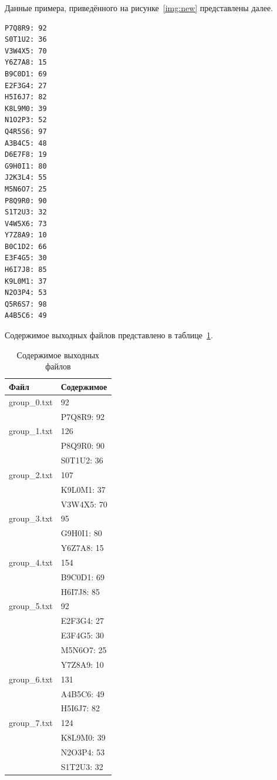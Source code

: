 Данные примера, приведённого на рисунке~\ref{img:new} представлены далее.
\begin{lstlisting}
P7Q8R9: 92
S0T1U2: 36
V3W4X5: 70
Y6Z7A8: 15
B9C0D1: 69
E2F3G4: 27
H5I6J7: 82
K8L9M0: 39
N1O2P3: 52
Q4R5S6: 97
A3B4C5: 48
D6E7F8: 19
G9H0I1: 80
J2K3L4: 55
M5N6O7: 25
P8Q9R0: 90
S1T2U3: 32
V4W5X6: 73
Y7Z8A9: 10
B0C1D2: 66
E3F4G5: 30
H6I7J8: 85
K9L0M1: 37
N2O3P4: 53
Q5R6S7: 98
A4B5C6: 49
\end{lstlisting}

Содержимое выходных файлов представлено в таблице~\ref{tab:output_files}.
\newpage
\begin{table}[H]
	\centering
	\small
	\caption{Содержимое выходных файлов}
	\label{tab:output_files}
	\begin{tabular}{|l|l|}
		\hline
		\textbf{Файл} & \textbf{Содержимое} \\ \hline
		group\_0.txt & 92 \\ 
		& P7Q8R9: 92 \\ \hline
		
		group\_1.txt & 126 \\
		& P8Q9R0: 90 \\
		& S0T1U2: 36 \\\hline
		
		group\_2.txt & 107 \\
		& K9L0M1: 37 \\
		& V3W4X5: 70 \\\hline
		
		group\_3.txt & 95 \\
		& G9H0I1: 80 \\
		& Y6Z7A8: 15 \\\hline
		
		
		group\_4.txt & 154 \\
		& B9C0D1: 69 \\
		& H6I7J8: 85 \\\hline
		
		group\_5.txt & 92 \\
		& E2F3G4: 27 \\
		& E3F4G5: 30 \\
		& M5N6O7: 25 \\
		& Y7Z8A9: 10 \\\hline
		
		
		group\_6.txt & 131 \\
		& A4B5C6: 49 \\
		& H5I6J7: 82 \\\hline
		
		group\_7.txt & 124 \\
		& K8L9M0: 39 \\
		& N2O3P4: 53 \\
		& S1T2U3: 32 \\\hline
		

\end{tabular}
\end{table}
